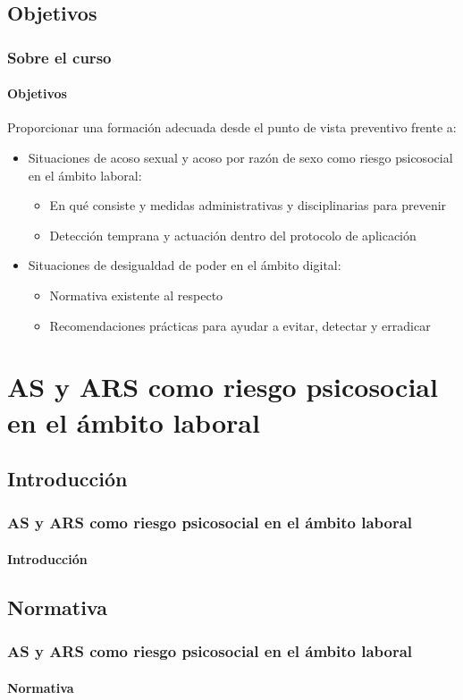 \documentclass{beamer}
\newcommand{\highlight}[1]{{\color{Blue} #1}}
\begin{document}
    \subsection{Objetivos}
    \begin{frame}
		\frametitle{Sobre el curso}
        \framesubtitle{Objetivos}
        Proporcionar una \highlight{formación adecuada} desde el punto de vista preventivo frente a:
        \begin{itemize}
            \item Situaciones de \highlight{acoso sexual y acoso por razón de sexo} como riesgo psicosocial en el ámbito laboral:
            \begin{itemize}
                \item En qué consiste y medidas administrativas y disciplinarias para prevenir
                \item Detección temprana y actuación dentro del protocolo de aplicación
            \end{itemize}
            \item Situaciones de desigualdad de poder en el \highlight{ámbito digital}:
            \begin{itemize}
                \item Normativa existente al respecto
                \item Recomendaciones prácticas para ayudar a evitar, detectar y erradicar
            \end{itemize}
        \end{itemize}
    \end{frame}

    \section{AS y ARS como riesgo psicosocial en el ámbito laboral}

    \subsection{Introducción}
    \begin{frame}
		\frametitle{AS y ARS como riesgo psicosocial en el ámbito laboral}
        \framesubtitle{Introducción}
	\end{frame}

    \subsection{Normativa}
    \begin{frame}
		\frametitle{AS y ARS como riesgo psicosocial en el ámbito laboral}
        \framesubtitle{Normativa}
	\end{frame}
\end{document}
